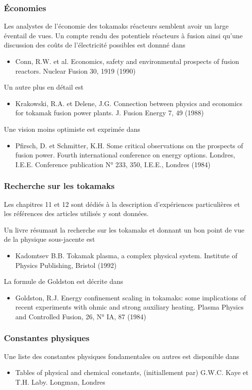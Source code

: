 \documentclass[main.tex]{subfiles}
\begin{document}
\subsubsection*{Économies}

Les analystes de l'économie des tokamaks réacteurs semblent avoir un large éventail de vues.
Un compte rendu des potentiels réacteurs à fusion ainsi qu'une discussion des coûts de l'électricité possibles est donnné dans
\begin{itemize}
	\item Conn, R.W. et al. Economics, safety and environmental prospects of fusion reactors. Nuclear Fusion 30, 1919 (1990)
\end{itemize}
Un autre plus en détail est
\begin{itemize}
	\item Krakowski, R.A. et Delene, J.G. Connection between physics and economics for tokamak fusion power plants. J. Fusion Energy 7, 49 (1988)
\end{itemize}
Une vision moins optimiste est exprimée dans
\begin{itemize}
	\item Pfirsch, D. et Schmitter, K.H. Some critical observations on the prospects of fusion power. Fourth international conference on energy options. Londres, I.E.E. Conference publication N° 233, 350, I.E.E., Londres (1984)
\end{itemize}

\subsubsection*{Recherche sur les tokamaks}

Les chapitres 11 et 12 sont dédiés à la description d'expériences particulières et les références des articles utilisés y sont données.

Un livre résumant la recherche sur les tokamaks et donnant un bon point de vue de la physique sous-jacente est
\begin{itemize}
	\item Kadomtsev B.B. Tokamak plasma, a complex physical system. Institute of Physics Publishing, Bristol (1992)
\end{itemize}

La formule de Goldston est décrite dans

\begin{itemize}
	\item Goldston, R.J. Energy confinement scaling in tokamaks: some implications of recent experiments with ohmic and strong auxiliary heating. Plasma Physics and Controlled Fusion, 26, N° IA, 87 (1984)
\end{itemize}

\subsubsection*{Constantes physiques}

Une liste des constantes physiques fondamentales ou autres est disponible dans

\begin{itemize}
	\item Tables of physical and chemical constants, (initiallement par) G.W.C. Kaye et T.H. Laby. Longman, Londres
\end{itemize}

\onecolumn
\end{document}
